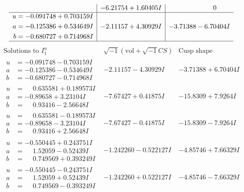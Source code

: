 \documentclass[1p]{elsarticle_modified}
\theoremstyle{definition}
\newcommand{\I}{\sqrt{-1}}
\begin{document}
$$\begin{array}{c|c|c}
 & -6.21754 + 1.60405 I & \phantom{-0.000000 } 0 \\ \hline\begin{aligned}
u &= -0.091748 + 0.703159 I \\
a &= -0.125386 + 0.534649 I \\
b &= -0.680727 + 0.714968 I\end{aligned}
 & -2.11157 + 4.30929 I & -3.71388 - 6.70404 I\\
 \hline 
 \end{array}$$\newpage$$\begin{array}{c|c|c}  
\text{Solutions to }I^u_{1}& \I (\text{vol} + \sqrt{-1}CS) & \text{Cusp shape}\\
 \hline 
\begin{aligned}
u &= -0.091748 - 0.703159 I \\
a &= -0.125386 - 0.534649 I \\
b &= -0.680727 - 0.714968 I\end{aligned}
 & -2.11157 - 4.30929 I & -3.71388 + 6.70404 I \\ \hline\begin{aligned}
u &= \phantom{-}0.635581 + 0.189573 I \\
a &= -0.89658 + 3.23104 I \\
b &= \phantom{-}0.93416 - 2.56648 I\end{aligned}
 & -7.67427 + 0.41875 I & -15.8309 + 7.9264 I \\ \hline\begin{aligned}
u &= \phantom{-}0.635581 - 0.189573 I \\
a &= -0.89658 - 3.23104 I \\
b &= \phantom{-}0.93416 + 2.56648 I\end{aligned}
 & -7.67427 - 0.41875 I & -15.8309 - 7.9264 I \\ \hline\begin{aligned}
u &= -0.550445 + 0.243751 I \\
a &= \phantom{-}1.52059 - 0.52439 I \\
b &= \phantom{-}0.749569 + 0.393249 I\end{aligned}
 & -1.242260 - 0.522127 I & -4.85746 + 7.66329 I \\ \hline\begin{aligned}
u &= -0.550445 - 0.243751 I \\
a &= \phantom{-}1.52059 + 0.52439 I \\
b &= \phantom{-}0.749569 - 0.393249 I\end{aligned}
 & -1.242260 + 0.522127 I & -4.85746 - 7.66329 I \\ \hline\begin{aligned}

\end{aligned}
\end{array}$$
\end{document}
